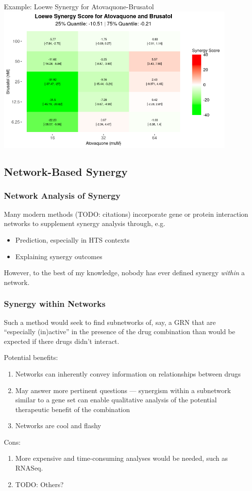 \documentclass{beamer}
\begin{document}
\begin{frame}{Example: Loewe Synergy for Atovaquone-Brusatol}
    \centering
    \includegraphics[width=0.9\textwidth]{figs/loewe-heatmap.png}
\end{frame}

\subsection{Network-Based Synergy}

\begin{frame}
  \frametitle{Network Analysis of Synergy}
  Many modern methods (TODO: citations) incorporate gene or protein interaction networks to supplement synergy analysis through, e.g.
  \begin{itemize}
    \item Prediction, especially in HTS contexts
    \item Explaining synergy outcomes
  \end{itemize}
  
  \vfill 
  However, to the best of my knowledge, nobody has ever defined \alert{synergy \textit{within} a network}.
\end{frame}


\begin{frame}
  \frametitle{Synergy within Networks}

  Such a method would seek to find subnetworks of, say, a GRN that are ``especially (in)active'' in the presence of the drug combination than would be expected if there drugs didn't interact.

  \vfill
  Potential benefits:
  \begin{enumerate}
    \item Networks can inherently convey information on relationships between drugs 
    \item May answer more pertinent questions --- synergism within a subnetwork similar to a gene set can enable qualitative analysis of the potential therapeutic benefit of the combination 
    \item Networks are cool and flashy
  \end{enumerate}
  Cons:
  \begin{enumerate}
    \item More expensive and time-consuming analyses would be needed, such as RNASeq.
    \item TODO: Others?
  \end{enumerate}
\end{frame}
\end{document}
